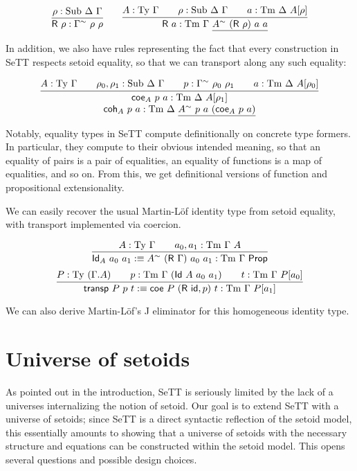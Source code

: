 \documentclass{easychair}
\newcommand{\GG}{\Gamma}
\newcommand{\GD}{\Delta}
\newcommand{\R}{\textsf{R}}
\newcommand{\Id}{\textsf{Id}}
\newcommand{\coe}{\textsf{coe}}
\newcommand{\coh}{\textsf{coh}}
\newcommand{\tyj}[2]{#2 : \Ty\ #1}
\newcommand{\tmj}[3]{#2 : \Tm\ #1\ #3}
\newcommand{\subj}[3]{#1 : \mathrm{Sub}\ #2\ #3}
\newcommand{\Prop}{\textsf{Prop}}
\newcommand{\Ty}{\mathrm{Ty}}
\newcommand{\Tm}{\mathrm{Tm}}
\newcommand{\Sub}{\mathrm{Sub}}
\begin{document}
\[
\infer{
  \textsf{R}\ \rho : \GG^\sim\ \rho\ \rho
}{
  \rho : \Sub\ \GD\ \GG
}
\qquad
\infer{
  \textsf{R}\ a : \Tm\ \GG\ \underline{A^\sim\ (\textsf{R}\ \rho)\ a\ a}
}{
  A : \Ty\ \GG
  \qquad
  \rho : \Sub\ \GD\ \GG
  \qquad
  a : \Tm\ \GD\ A[\rho]
}
\]

In addition, we also have rules representing the fact that every construction in
SeTT respects setoid equality, so that we can transport along any such equality:

    \[
    \infer{
      \deduce{
        \tmj{\GD}{\coh_A\ p\ a}{\underline{A^\sim\ p\ a\ (\coe_A\ p\ a)}}
      }{
        \tmj{\GD}{\coe_A\ p\ a}{A[\rho_1]}
      }
    }{
      \tyj{\GG}{A} \qquad \subj{\rho_0, \rho_1}{\GD}{\GG} \qquad
      p : \GG^\sim\ \rho_0\ \rho_1\qquad
      \tmj{\GD}{a}{A[\rho_0]}
    }
    \]

Notably, equality types in SeTT compute definitionally on concrete type
formers. In particular, they compute to their obvious intended meaning, so that
an equality of pairs is a pair of equalities, an equality of functions is a map
of equalities, and so on. From this, we get definitional versions of function
and propositional extensionality.

We can easily recover the usual Martin-L\"of identity type from setoid equality,
with transport implemented via coercion.

\[
\infer{
  \textsf{Id}_A\ a_0\ a_1 :\equiv A^{\sim}\ (\R\ \GG)\ a_0\ a_1 : \Tm\ \GG\ \Prop
}{
  \tyj{\GG}{A} \qquad \tmj{\GG}{a_0, a_1}{A}
}
\]
\[
\infer{
  \textsf{transp}\ P\ p\ t :\equiv
    \coe\ P\ (\textsf{R}\ \textsf{id} , p)\ t : \Tm\ \GG\ P[a_1]
}{
  P : \Ty\ (\GG . A)
  \qquad
  p : \Tm\ \GG\ (\Id\ A\ a_0\ a_1)
  \qquad
  t : \Tm\ \GG\ P[a_0]
}
\]

We can also derive Martin-L\"of's J eliminator for this homogeneous identity
type.

\section{Universe of setoids}\label{setoid-universe}

As pointed out in the introduction, SeTT is seriously limited by the lack of a
universes internalizing the notion of setoid. Our goal is to extend SeTT with a
universe of setoids; since SeTT is a direct syntactic reflection of the setoid
model, this essentially amounts to showing that a universe of setoids with the
necessary structure and equations can be constructed within the setoid
model. This opens several questions and possible design choices.
\end{document}
